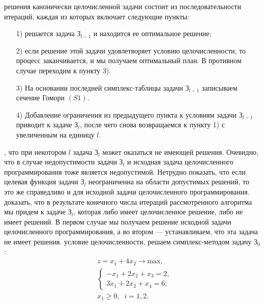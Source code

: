  решения канонически целочисленной задачи состоит из последовательности итераций, каждая из которых включает следующие пункты:
\begin{enumerate}
\item[1)] решается задача З$_{l-1}$ и находится ее оптимальное решение;
\item[2)] если решение этой задачи удовлетворяет условию целочисленности, то процесс заканчивается, и мы получаем оптимальный план. В противном случае переходим к пункту 3).
\item[3)] На основании последней симплекс-таблицы задачи З$_{l-1}$ записываем сечение Гомори $(S1)$.
\item[4)] Добавление ограничения из предыдущего пункта к условиям задачи З$_{l-1}$ приводит к задаче З$_l$, после чего снова возвращаемся к пункту 1) с увеличенным на единицу $l$.
\end{enumerate}
, что при некотором $l$ задача З$_l$ может оказаться не имеющей решения. Очевидно, что в случае недопустимости задачи З$_l$ и исходная задача целочисленного программирования тоже является недопустимой. Нетрудно показать, что если целевая функция задачи З$_l$ неограниченна на области допустимых решений, то это же справедливо и для исходной задачи целочисленного программирования.
 доказать, что в результате конечного числа итераций рассмотренного алгоритма мы придем к задаче З$_l$, которая либо имеет целочисленное решение, либо не имеет решений. В первом случае мы получаем решение исходной задачи целочисленного программирования, а во втором — устанавливаем, что эта задача не имеет решения.
 условие целочисленности, решаем симплекс-методом задачу З$_0$:
\begin{equation*}
\begin{split}
	&z = x_1 + 4x_2 \rightarrow \textrm{max},\\
	&\begin{cases}
		-x_1 + 2x_2 + x_3 = 2,\\
		3x_1 + 2x_2 + x_4 = 6;
	\end{cases}\\
	&x_1 \geq 0, \;\; i = 1,2.
\end{split}
\end{equation*}
